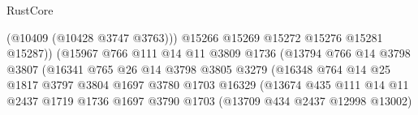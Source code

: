 \begin{lexlean}{RustCore}
\begin{coremodule}
                                              (@10409 (@10428 @3747 @3763)))
                                            @15266
                                            @15269
                                            @15272
                                            @15276
                                            @15281
                                            @15287))
                                        (@15967
                                          @766
                                          @111
                                          @14
                                          @11
                                          @3809
                                          @1736
                                          (@13794
                                            @766
                                            @14
                                            @3798
                                            @3807
                                            (@16341
                                              @765
                                              @26
                                              @14
                                              @3798
                                              @3805
                                              @3279
                                              (@16348
                                                @764
                                                @14
                                                @25
                                                @1817
                                                @3797
                                                @3804
                                                @1697
                                                @3780
                                                @1703
                                                @16329
                                                (@13674
                                                  @435
                                                  @111
                                                  @14
                                                  @11
                                                  @2437
                                                  @1719
                                                  @1736
                                                  @1697
                                                  @3790
                                                  @1703
                                                  (@13709 @434 @2437 @12998 @13002)

\end{coremodule}
\end{lexlean}
